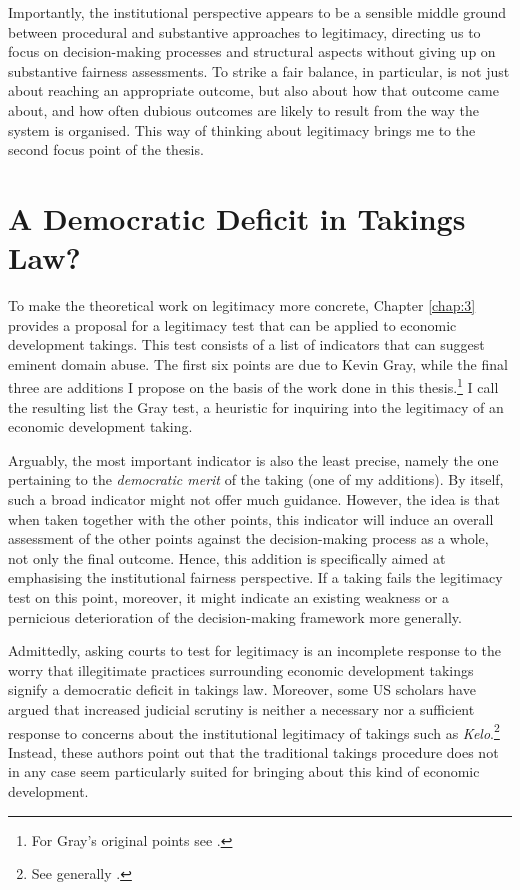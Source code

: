 Importantly, the institutional perspective appears to be a sensible middle ground between procedural and substantive approaches to legitimacy, directing us to focus on decision-making processes and structural aspects without giving up on substantive fairness assessments. To strike a fair balance, in particular, is not just about reaching an appropriate outcome, but also about how that outcome came about, and how often dubious outcomes are likely to result from the way the system is organised. This way of thinking about legitimacy brings me to the second focus point of the thesis.

\section{A Democratic Deficit in Takings Law?}\label{sec:1:2}

To make the theoretical work on legitimacy more concrete, Chapter \ref{chap:3} provides a proposal for a legitimacy test that can be applied to economic development takings. This test consists of a list of indicators that can suggest eminent domain abuse. The first six points are due to Kevin Gray, while the final three are additions I propose on the basis of the work done in this thesis.\footnote{For Gray's original points see \cite{gray11}.} I call the resulting list the Gray test, a heuristic for inquiring into the legitimacy of an economic development taking.

Arguably, the most important indicator is also the least precise, namely the one pertaining to the {\it democratic merit} of the taking (one of my additions). By itself, such a broad indicator might not offer much guidance. However, the idea is that when taken together with the other points, this indicator will induce an overall assessment of the other points against the decision-making process as a whole, not only the final outcome. Hence, this addition is specifically aimed at emphasising the institutional fairness perspective. If a taking fails the legitimacy test on this point, moreover, it might indicate an existing weakness or a pernicious deterioration of the decision-making framework more generally.

Admittedly, asking courts to test for legitimacy is an incomplete response to the worry that illegitimate practices surrounding economic development takings signify a democratic deficit in takings law. Moreover, some US scholars have argued that increased judicial scrutiny is neither a necessary nor a sufficient response to concerns about the institutional legitimacy of takings such as {\it Kelo}.\footnote{See generally \cite{lehavi07,heller08}.} Instead, these authors point out that the traditional takings procedure does not in any case seem particularly suited for bringing about this kind of economic development.

